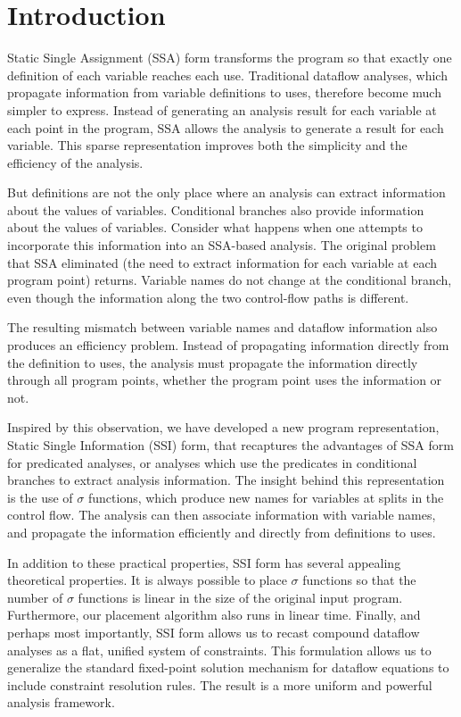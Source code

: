 \section{Introduction}

Static Single Assignment (SSA) form transforms the
program so that exactly one definition of each 
variable reaches each use. Traditional dataflow
analyses, which propagate information from variable
definitions to uses, therefore become much simpler
to express. Instead of generating an analysis 
result for each variable at each point in the
program, SSA allows the analysis to generate a 
result for each variable. This sparse
representation improves both the simplicity
and the efficiency of the analysis. 

But definitions are not the only place where
an analysis can extract information about the
values of variables. Conditional branches also
provide information about the values of variables.
Consider what happens when one attempts to incorporate
this information into an SSA-based analysis. The
original problem that SSA eliminated (the need to
extract information for each variable at each
program point) returns. Variable names do not
change at the conditional branch, even though
the information along the two control-flow
paths is different.

The resulting mismatch between variable names
and dataflow information also produces an efficiency
problem. Instead of propagating information
directly from the definition to uses, the analysis
must propagate the information directly through all 
program points, whether the program point uses
the information or not. 

Inspired by this observation, we have developed
a new program representation, 
Static Single Information (SSI) form,  that recaptures
the advantages of SSA form for predicated analyses,
or analyses which use the predicates in conditional
branches to extract analysis information.
The insight behind this representation is the use
of $\sigma$ functions, which produce new names
for variables at splits in the control flow.
The analysis can then associate information
with variable names, and propagate
the information efficiently and directly from 
definitions to uses. 

In addition to these practical properties, 
SSI form has several appealing 
theoretical properties. It is always possible 
to place $\sigma$ functions so that the
number of $\sigma$ functions is linear in the size
of the original input program. Furthermore, our
placement algorithm also runs in linear time. 
Finally, and perhaps most importantly, SSI form
allows us to recast compound dataflow analyses as
a flat, unified system of constraints. This
formulation allows us to generalize the standard
fixed-point solution
mechanism for dataflow equations to include 
constraint resolution rules. The result is 
a more uniform and powerful analysis framework.

